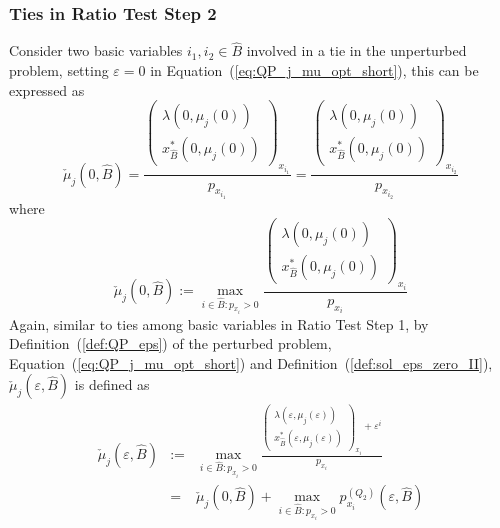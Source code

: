 \documentclass[a4paper]{article}
\begin{document}
\subsubsection{Ties in Ratio Test Step 2}
\label{sec:Ties_ratio_test_step_2}
Consider two basic variables $i_{1}, i_{2} \in \hat{B}$ involved in a tie in
the unperturbed problem, setting $\varepsilon=0$ in
Equation~(\ref{eq:QP_j_mu_opt_short}), this can be expressed as 
\begin{equation}
\check{\mu}_{j}(0, \hat{B}) =
\frac{\left(\begin{array}{c}
              \lambda\left(0, \mu_{j}(0) \right) \\
              \hline
               x_{\hat{B}}^{*}\left(0, \mu_{j}(0) \right)
            \end{array}
      \right)_{x_{i_{1}}}}{p_{x_{i_{1}}}}
=
\frac{\left(\begin{array}{c}
              \lambda\left(0, \mu_{j}(0) \right) \\
              \hline
              x_{\hat{B}}^{*}\left(0, \mu_{j}(0)\right) 
            \end{array}
       \right)_{x_{i_{2}}}}{p_{x_{i_{2}}}}
\end{equation}
where
\begin{equation}
\label{def:hat_mu_j_max_0}
  \check{\mu}_{j}(0, \hat{B}) :=
  \max_{i \in \hat{B}: p_{x_{i}} > 0}
  \frac{\left(\begin{array}{c}
                \lambda\left(0, \mu_{j}(0) \right) \\
	        \hline
	        x_{\hat{B}}^{*}\left(0, \mu_{j}(0) \right)
	       \end{array}
         \right)_{x_{i}}}{p_{x_{i}}} 
\end{equation}
Again, similar to ties among basic variables in Ratio Test Step 1,
by Definition~(\ref{def:QP_eps}) of the perturbed problem,
Equation~(\ref{eq:QP_j_mu_opt_short}) and
Definition~(\ref{def:sol_eps_zero_II}),
$\check{\mu}_{j}(\varepsilon, \hat{B})$ is defined as
\begin{eqnarray}
\label{def:hat_mu_j_max_eps}
\check{\mu}_{j}(\varepsilon, \hat{B}) & := &
  \max_{i \in \hat{B}: p_{x_{i}} > 0}
  \frac{\left(\begin{array}{c}
                \lambda\left(\varepsilon, \mu_{j}(\varepsilon) \right) \\
	        \hline
	        x_{\hat{B}}^{*}\left(\varepsilon, \mu_{j}(\varepsilon) \right)
	      \end{array}
        \right)_{x_{i}}+ \varepsilon^{i}}{p_{x_{i}}} \\
  &=&
  \check{\mu}_{j}(0, \hat{B}) +
  \max_{i \in \hat{B}: p_{x_{i}} > 0} p_{x_{i}}^{(Q_{2})}
  (\varepsilon, \hat{B})
\end{eqnarray}
\end{document}
